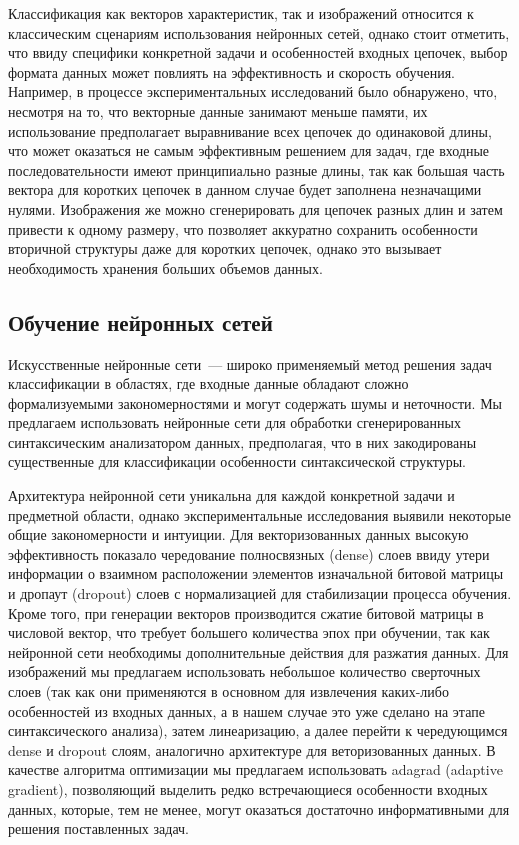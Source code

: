 Классификация как векторов характеристик, так и изображений относится к классическим сценариям использования нейронных сетей, однако стоит отметить, что ввиду специфики конкретной задачи и особенностей входных цепочек, выбор формата данных может повлиять на эффективность и скорость обучения. Например, в процессе экспериментальных исследований было обнаружено, что, несмотря на то, что векторные данные занимают меньше памяти, их использование предполагает выравнивание всех цепочек до одинаковой длины, что может оказаться не самым эффективным решением для задач, где входные последовательности имеют принципиально разные длины, так как большая часть вектора для коротких цепочек в данном случае будет заполнена незначащими нулями. Изображения же можно сгенерировать для цепочек разных длин и затем привести к одному размеру, что позволяет аккуратно сохранить особенности вторичной структуры даже для коротких цепочек, однако это вызывает необходимость хранения больших объемов данных.

\subsection{Обучение нейронных сетей}
Искусственные нейронные сети~--- широко применяемый метод решения задач классификации в областях, где входные данные обладают сложно формализуемыми закономерностями и могут содержать шумы и неточности. Мы предлагаем использовать нейронные сети для обработки сгенерированных синтаксическим анализатором данных, предполагая, что в них закодированы существенные для классификации особенности синтаксической структуры.

Архитектура нейронной сети уникальна для каждой конкретной задачи и предметной области, однако экспериментальные исследования выявили некоторые общие закономерности и интуиции. Для векторизованных данных высокую эффективность показало чередование полносвязных (dense) слоев ввиду утери информации о взаимном расположении элементов изначальной битовой матрицы и дропаут (dropout) слоев с нормализацией для стабилизации процесса обучения. Кроме того, при генерации векторов производится сжатие битовой матрицы в числовой вектор, что требует большего количества эпох при обучении, так как нейронной сети необходимы дополнительные действия для разжатия данных. Для изображений мы предлагаем использовать небольшое количество сверточных слоев (так как они применяются в основном для извлечения каких-либо особенностей из входных данных, а в нашем случае это уже сделано на этапе синтаксического анализа), затем линеаризацию, а далее перейти к чередующимся dense и dropout слоям, аналогично архитектуре для веторизованных данных. В качестве алгоритма оптимизации мы предлагаем использовать adagrad (adaptive gradient), позволяющий выделить редко встречающиеся особенности входных данных, которые, тем не менее, могут оказаться достаточно информативными для решения поставленных задач.

